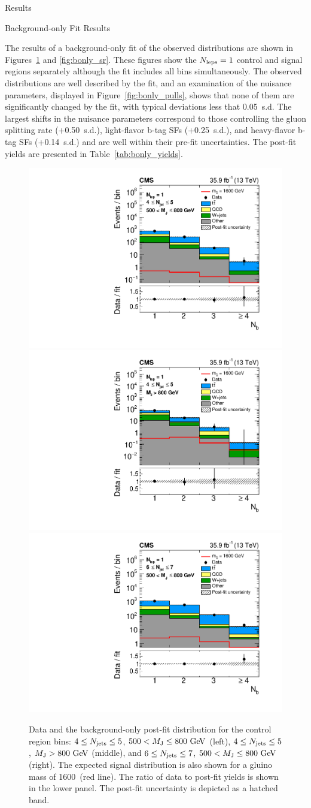 \begin{section}{Results}

\begin{subsection}{Background-only Fit Results}

The results of a background-only fit of the observed \Nb distributions are shown in Figures~\ref{fig:bonly_cr} and \ref{fig:bonly_sr}.
These figures show the $N_{\mathrm{leps}} = 1$ control and signal regions separately although the fit includes all bins simultaneously. 
The observed \Nb distributions are well described by the fit, and an examination of the nuisance parameters, displayed in Figure~\ref{fig:bonly_pulls}, shows that none of them are significantly changed by the fit, with typical deviations less that 0.05~s.d.
The largest shifts in the nuisance parameters correspond to those controlling the gluon splitting rate (+0.50~s.d.), light-flavor b-tag SFs (+0.25~s.d.), and heavy-flavor b-tag SFs (+0.14~s.d.) and are well within their pre-fit uncertainties.
The post-fit yields are presented in Table~\ref{tab:bonly_yields}.

\begin{figure}[tbp!]
\centering
\includegraphics[angle=0,width=0.32\columnwidth]{fig/bonly_nlep1_nj45_lowmj.pdf}
\includegraphics[angle=0,width=0.32\columnwidth]{fig/bonly_nlep1_nj45_highmj.pdf}
\includegraphics[angle=0,width=0.32\columnwidth]{fig/bonly_nlep1_nj67_lowmj.pdf}
\caption{Data and the background-only post-fit \Nb distribution for the control region bins: $4 \leq N_{\mathrm{jets}} \leq 5$, $500 < M_{\mathrm{J}} \leq 800~\mathrm{Ge\kern -0.1em V}$ (left), $4 \leq N_{\mathrm{jets}} \leq 5$, $M_{\mathrm{J}} > 800~\mathrm{Ge\kern -0.1em V}$ (middle), and $6 \leq N_{\mathrm{jets}} \leq 7$, $500 < M_{\mathrm{J}} \leq 800~\mathrm{Ge\kern -0.1em V}$ (right).
The expected signal distribution is also shown for a gluino mass of 1600~\GeV (red line).
The ratio of data to post-fit yields is shown in the lower panel.
The post-fit uncertainty is depicted as a hatched band.}
\label{fig:bonly_cr}
\end{figure}


\end{subsection}
\end{section}
